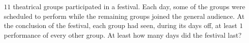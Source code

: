 $11$ theatrical groups participated in a festival. Each day, some of the groups were scheduled to perform while the remaining groups joined the general audience. At the conclusion of the festival, each group had seen, during its days off, at least $1$ performance of every other group. At least how many days did the festival last?